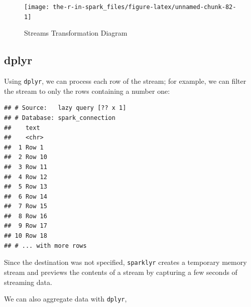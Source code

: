\documentclass[]{book}
\newenvironment{Shaded}{\begin{snugshade}}{\end{snugshade}}
\newcommand{\DataTypeTok}[1]{\textcolor[rgb]{0.13,0.29,0.53}{#1}}
\newcommand{\KeywordTok}[1]{\textcolor[rgb]{0.13,0.29,0.53}{\textbf{#1}}}
\newcommand{\NormalTok}[1]{#1}
\newcommand{\OperatorTok}[1]{\textcolor[rgb]{0.81,0.36,0.00}{\textbf{#1}}}
\newcommand{\OtherTok}[1]{\textcolor[rgb]{0.56,0.35,0.01}{#1}}
\newcommand{\StringTok}[1]{\textcolor[rgb]{0.31,0.60,0.02}{#1}}
\theoremstyle{definition}
\theoremstyle{definition}
\theoremstyle{definition}
\theoremstyle{remark}
\begin{document}
\begin{figure}

{\centering \texttt{[image: the-r-in-spark\_files/figure-latex/unnamed-chunk-82-1]} 

}

\caption{Streams Transformation Diagram}\label{fig:unnamed-chunk-82}
\end{figure}

\hypertarget{streams-dplyr}{%
\subsection{dplyr}\label{streams-dplyr}}

Using \texttt{dplyr}, we can process each row of the stream; for
example, we can filter the stream to only the rows containing a number
one:

\begin{Shaded}
\end{Shaded}

\begin{verbatim}
## # Source:   lazy query [?? x 1]
## # Database: spark_connection
##    text  
##    <chr> 
##  1 Row 1 
##  2 Row 10
##  3 Row 11
##  4 Row 12
##  5 Row 13
##  6 Row 14
##  7 Row 15
##  8 Row 16
##  9 Row 17
## 10 Row 18
## # ... with more rows
\end{verbatim}

Since the destination was not specified, \texttt{sparklyr} creates a
temporary memory stream and previews the contents of a stream by
capturing a few seconds of streaming data.

We can also aggregate data with \texttt{dplyr},

\begin{Shaded}
\end{Shaded}
\end{document}
